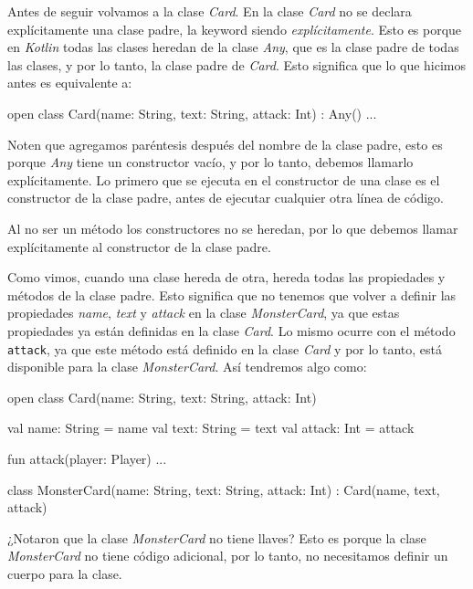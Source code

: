   Antes de seguir volvamos a la clase \textit{Card}.
  En la clase \textit{Card} no se declara explícitamente una clase padre, la keyword siendo 
  \textit{explícitamente}.
  Esto es porque en \textit{Kotlin} todas las clases heredan de la clase 
  \textit{Any}\autocite*{BuiltinTypesTheira}, que es la clase padre de todas las clases, y por lo 
  tanto, la clase padre de \textit{Card}.
  Esto significa que lo que hicimos antes es equivalente a:

  \begin{kotlin}
    open class Card(name: String, text: String, attack: Int) : Any() {...}
  \end{kotlin}

  Noten que agregamos paréntesis después del nombre de la clase padre, esto es porque \textit{Any}
  tiene un constructor vacío, y por lo tanto, debemos llamarlo explícitamente.
  Lo primero que se ejecuta en el constructor de una clase es el constructor de la clase padre,
  antes de ejecutar cualquier otra línea de código.

  \begin{important}
    Al no ser un método los constructores no se heredan, por lo que debemos llamar explícitamente
    al constructor de la clase padre.
  \end{important}

  Como vimos, cuando una clase hereda de otra, hereda todas las propiedades y métodos de la clase
  padre.
  Esto significa que no tenemos que volver a definir las propiedades \textit{name}, \textit{text}
  y \textit{attack} en la clase \textit{MonsterCard}, ya que estas propiedades ya están definidas
  en la clase \textit{Card}.
  Lo mismo ocurre con el método \texttt{attack}, ya que este método está definido en la clase
  \textit{Card} y por lo tanto, está disponible para la clase \textit{MonsterCard}.
  Así tendremos algo como:

  \begin{kotlin}
    open class Card(name: String, text: String, attack: Int) {
      val name: String = name
      val text: String = text
      val attack: Int = attack

      fun attack(player: Player) {...}
    }
  \end{kotlin}

  \begin{kotlin}
    class MonsterCard(name: String, text: String, attack: Int) : Card(name, text, attack)
  \end{kotlin}

  ¿Notaron que la clase \textit{MonsterCard} no tiene llaves?
  Esto es porque la clase \textit{MonsterCard} no tiene código adicional, por lo tanto, no
  necesitamos definir un cuerpo para la clase.

